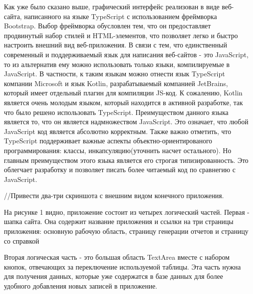 Как уже было сказано выше, графический интерфейс реализован в виде веб-сайта, написанного на языке TypeScript с 
использованием фреймворка Bootstrap.
Выбор фреймворка обусловлен тем, что он предоставляет продвинутый набор стилей и HTML-элементов, что позволяет 
легко и быстро настроить внешний вид веб-приложения.
В связи с тем, что единственный современный и поддерживаемый язык для написания веб-сайтов - это JavaScript, то 
из альтернатив ему можно использовать только языки, компилируемые в JavaScript. В частности, к таким языкам можно 
отнести язык TypeScript компании Microsoft и язык Kotlin, разрабатываемый компанией JetBrains, который имеет 
отдельный плагин для компиляции JS-код. К сожалению, Kotlin является очень молодым языком, который находится в 
активной разработке, так что было решено использовать TypeScript. Преимуществом данного языка является то, что 
он является надмножеством JavaScript. Это означает, что любой JavaScript код является абсолютно корректным. Также 
важно отметить, что TypeScript поддерживает важные аспекты объектно-ориентированого программирования: классы, 
инкапсуляцию(уточнить насчет остального). Но главным преимуществом этого языка является его строгая типизированность. 
Это облегчает разработку и позволяет писать более читаемый код по сравнегию с JavaScript.

//Привести два-три скриншота с внешним видом конечного приложения.

На рисунке 1 видно, приложение состоит из четырех логический частей. Первая - шапка сайта. Она содержит название 
приложения и ссылки на три страницы приложения: основную рабочую область, страницу генерации отчетов и страницу со 
справкой

Вторая логическая часть - это большая область TextArea вместе с набором кнопок, отвечающих за переключение используемой 
таблицы. Эта часть нужна для получения данных, которые уже содержатся в базе данных для более удобного добавления новых 
записей в приложение.
